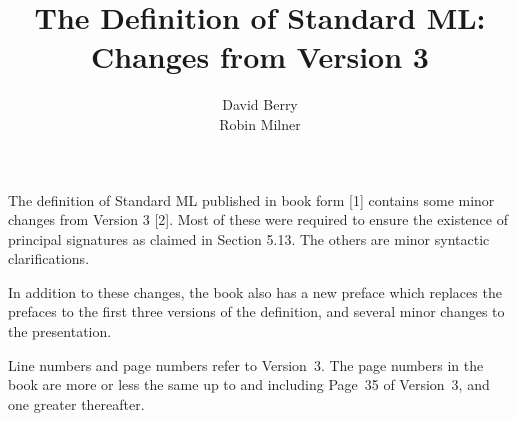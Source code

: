 \title{The Definition of Standard ML:\\
Changes from Version 3}
\author{David Berry\\Robin Milner}


\maketitle

\noindent
 The definition of Standard ML published in book form [1]
contains some minor changes from Version 3 [2].  Most of these were required
to ensure the existence of principal signatures as claimed in Section 5.13.  
The others are minor syntactic clarifications.

In addition to these changes, the book also has a new preface which
replaces the prefaces to the first three versions of the definition, and
several minor changes to the presentation.

Line numbers and page numbers refer to Version~3.  The page numbers in
the book are more or less the same up to and including Page~35 of Version~3,
and one greater thereafter.
\bigskip


